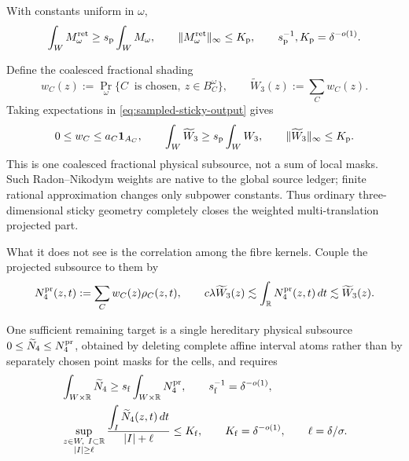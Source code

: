 \documentclass[11pt]{article}
\begin{document}
With constants uniform in \(\omega\),
\begin{equation}\label{eq:sampled-sticky-output}
 \int_WM_\omega^{\rm ret}
 \ge s_{\rm p}\int_WM_\omega,
 \qquad
 \|M_\omega^{\rm ret}\|_\infty\le K_{\rm p},
 \qquad
 s_{\rm p}^{-1},K_{\rm p}=\delta^{-o(1)}.
\end{equation}

Define the coalesced fractional shading
\[
 w_C(z):=\Pr_\omega\{C\ \text{ is chosen},\ z\in B_C^\omega\},
 \qquad
 \widetilde W_3(z):=\sum_Cw_C(z).
\]
Taking expectations in \eqref{eq:sampled-sticky-output} gives
\begin{equation}\label{eq:marked-sticky-projected-source}
 0\le w_C\le a_C{\bf1}_{A_C},
 \qquad
 \int_W\widetilde W_3\ge s_{\rm p}\int_WW_3,
 \qquad
 \|\widetilde W_3\|_\infty\le K_{\rm p}.
\end{equation}
This is one coalesced fractional physical subsource, not a sum of local masks.
Such Radon--Nikodym weights are native to the global source ledger; finite
rational approximation changes only subpower constants.  Thus ordinary
three-dimensional sticky geometry completely closes the weighted
multi-translation projected part.

What it does not see is the correlation among the fibre kernels.  Couple the
projected subsource to them by
\begin{equation}\label{eq:projected-retained-four-dimensional-source}
 N_4^{\rm pr}(z,t):=\sum_Cw_C(z)\rho_C(z,t),
 \qquad
 c\lambda\widetilde W_3(z)
 \lesssim\int_{\mathbb R}N_4^{\rm pr}(z,t)\,dt
 \lesssim\widetilde W_3(z).
\end{equation}

One sufficient remaining target is a single hereditary physical subsource
\(0\le\widetilde N_4\le N_4^{\rm pr}\), obtained by deleting complete affine
interval atoms rather than by separately chosen point masks for the cells, and
requires
\begin{equation}\label{eq:marked-fibre-frostman-capacity}
 \begin{split}
  &\int_{W\times\mathbb R}\widetilde N_4
   \ge s_{\rm f}\int_{W\times\mathbb R}N_4^{\rm pr},
   \qquad s_{\rm f}^{-1}=\delta^{-o(1)},\\
  &\sup_{\substack{z\in W,\ I\subset\mathbb R\\
                          |I|\ge\ell}}
   \frac{\displaystyle\int_I\widetilde N_4(z,t)\,dt}
        {|I|+\ell}
   \le K_{\rm f},
   \qquad K_{\rm f}=\delta^{-o(1)},
   \qquad \ell=\delta/\sigma .
 \end{split}
\end{equation}
\end{document}
